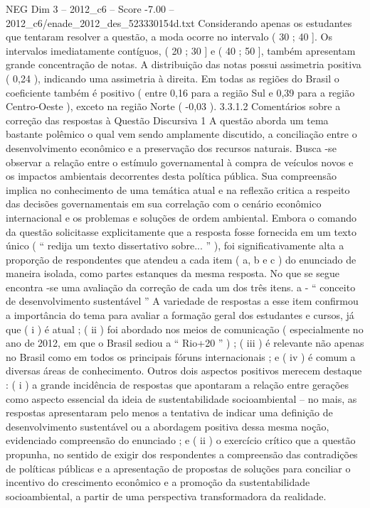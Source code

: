 \begin{textsample}{NEG Dim 3 – 2012\_c6 – Score -7.00 – 2012\_c6/enade\_2012\_des\_523330154d.txt}
Considerando apenas os estudantes que tentaram resolver a questão, a moda ocorre no intervalo ( 30 ; 40 ].
Os intervalos imediatamente contíguos, ( 20 ; 30 ] e ( 40 ; 50 ], também apresentam grande concentração de notas.
A distribuição das notas possui assimetria positiva ( 0,24 ), indicando uma assimetria à direita.
Em todas as regiões do Brasil o coeficiente também é positivo ( entre 0,16 para a região Sul e 0,39 para a região Centro-Oeste ), exceto na região Norte ( -0,03 ). 3.3.1.2 Comentários sobre a correção das respostas à Questão Discursiva 1 A questão aborda um tema bastante polêmico o qual vem sendo amplamente discutido, a conciliação entre o desenvolvimento econômico e a preservação dos recursos naturais.
Busca -se observar a relação entre o estímulo governamental à compra de veículos novos e os impactos ambientais decorrentes desta política pública.
Sua compreensão implica no conhecimento de uma temática atual e na reflexão critica a respeito das decisões governamentais em sua correlação com o cenário econômico internacional e os problemas e soluções de ordem ambiental.
Embora o comando da questão solicitasse explicitamente que a resposta fosse fornecida em um texto único ( “ redija um texto dissertativo sobre... ” ), foi significativamente alta a proporção de respondentes que atendeu a cada item ( a, b e c ) do enunciado de maneira isolada, como partes estanques da mesma resposta.
No que se segue encontra -se uma avaliação da correção de cada um dos três itens. a - “ conceito de desenvolvimento sustentável ” A variedade de respostas a esse item confirmou a importância do tema para avaliar a formação geral dos estudantes e cursos, já que ( i ) é atual ; ( ii ) foi abordado nos meios de comunicação ( especialmente no ano de 2012, em que o Brasil sediou a “ Rio+20 ” ) ; ( iii ) é relevante não apenas no Brasil como em todos os principais fóruns internacionais ; e ( iv ) é comum a diversas áreas de conhecimento.
Outros dois aspectos positivos merecem destaque : ( i ) a grande incidência de respostas que apontaram a relação entre gerações como aspecto essencial da ideia de sustentabilidade socioambiental – no mais, as respostas apresentaram pelo menos a tentativa de indicar uma definição de desenvolvimento sustentável ou a abordagem positiva dessa mesma noção, evidenciado compreensão do enunciado ; e ( ii ) o exercício crítico que a questão propunha, no sentido de exigir dos respondentes a compreensão das contradições de políticas públicas e a apresentação de propostas de soluções para conciliar o incentivo do crescimento econômico e a promoção da sustentabilidade socioambiental, a partir de uma perspectiva transformadora da realidade.

\end{textsample}
